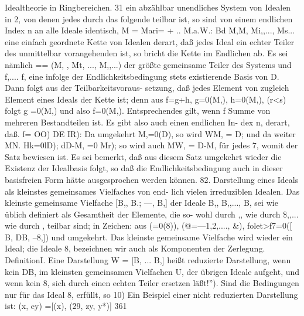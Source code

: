 \documentclass[11pt,a4paper]{article}
\theoremstyle{plain}
\theoremstyle{definition}
\begin{document}
Idealtheorie in Ringbereichen. 
31 
ein abzählbar 
unendliches System von Idealen in 2, von denen jedes 
durch das folgende teilbar ist, so sind von einem endlichen Index n an alle 
Ideale identisch, 
M = Mari= + .. M.a.W.: Bd M,M, 
Mi,,..., Ms... 
eine einfach geordnete Kette von Idealen derart, daß jedes Ideal 
ein 
echter Teiler des unmittelbar vorangehenden ist, so bricht die Kette im 
Endlichen ab. 
Es sei nämlich  == (M, , Mt, ..., M,,...) der größte gemeinsame 
Teiler des Systems und f,.... f, eine infolge der Endlichkeitsbedingung 
stets existierende Basis von D. 
Dann folgt aus der Teilbarkeitsvoraus- 
setzung, daß jedes Element von  zugleich Element 
eines Ideals 
der 
Kette ist; denn aus 
f=g+h, 
g=0(M,), 
h=0(M,), 
(r<s) 
folgt g =0(M,) und also f=0(M,). 
Entsprechendes gilt, wenn f Summe 
von mehreren Bestandteilen ist. 
Es gibt also auch einen 
endlichen In- 
dex n, derart, daß. 
f= OO) 
DE 
IR): 
Da umgekehrt M,=0(D), so wird WM, = D; und da weiter 
MN. Hk=0lD); 
dD-M, =0 
Mr); 
so wird auch MW, = D-M, für jedes 7, womit der Satz bewiesen ist. 
Es sei bemerkt, daß aus diesem Satz umgekehrt wieder die Existenz 
der Idealbasis 
folgt, 
so daß die Endlichkeitsbedingung auch in dieser 
basisfreien Form hätte ausgesprochen werden können. 
82. 
Darstellung eines Ideals als kleinstes gemeinsames Vielfaches von end- 
lich vielen irreduziblen Idealen. 
Das kleinste gemeinsame Vielfache [B,, B.; ---, B,] der Ideale B,, 
B,,..., B, sei wie üblich definiert als Gesamtheit der Elemente, 
die so- 
wohl durch ,, wie durch \$,,... wie durch , teilbar sind; in Zeichen: 
aus 
(=0(8)), (@=---1,2,...., \&), folet>f7=0([ 
B, DB, --8,]) 
und umgekehrt. 
Das kleinste gemeinsame Vielfache wird wieder ein Ideal; 
die Ideale 8, bezeichnen wir auch als Komponenten der Zerlegung. 
DefinitionI. 
Eine Darstellung 
W = [B, ... B,] heißt reduzierte 
Darstellung, wenn kein DB, im kleinsten gemeinsamen Vielfachen U, der 
übrigen Ideale aufgeht, und wenn kein 8, sich durch einen echten Teiler 
ersetzen läßt!''). Sind die Bedingungen nur für das Ideal 8, erfüllt, so 
10) Ein Beispiel einer nicht reduzierten Darstellung ist: 
(x, ey) =[(x), (29, zy, y*)] 
361
\end{document}
